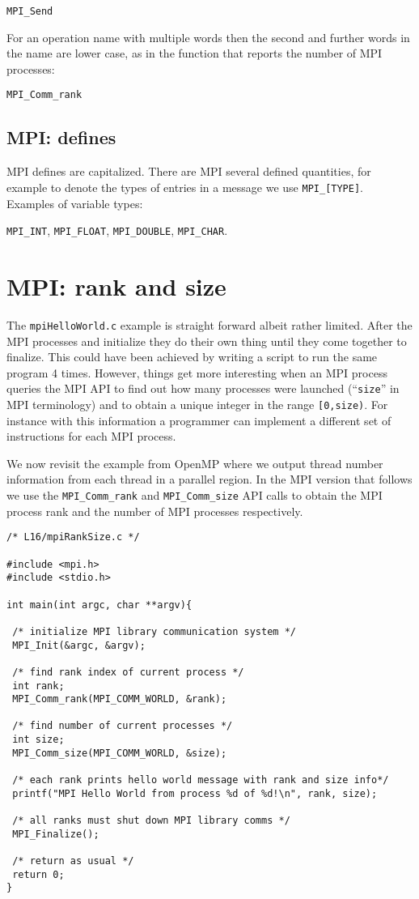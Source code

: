 \texttt{MPI\_Send}

For an operation name with multiple words then the second and further words in the name are lower case, as in the function that reports the number of MPI processes: 

\texttt{MPI\_Comm\_rank}

\subsection{MPI: defines}

MPI defines are capitalized. There are MPI several defined quantities, for example to denote the types of entries in a message we use \texttt{MPI\_[TYPE]}.  Examples of variable types:

\texttt{MPI\_INT}, \texttt{MPI\_FLOAT}, \texttt{MPI\_DOUBLE}, \texttt{MPI\_CHAR}.


\section{MPI: rank and size}

The \texttt{mpiHelloWorld.c} example is straight forward albeit rather limited. After the MPI processes and initialize they do their own thing until they come together to finalize. This could have been achieved by writing a script to run the same program 4 times. However, things get more interesting when an MPI process queries the MPI API to find out how many processes were launched (``\texttt{size}'' in MPI terminology) and to  obtain a unique integer in the range \texttt{[0,size)}. For instance with this information a programmer can implement a different set of instructions for each MPI process. 

We now revisit the example from OpenMP where we output thread number information from each thread in a parallel region. In the MPI version that follows we use the \texttt{MPI\_Comm\_rank} and \texttt{MPI\_Comm\_size} API calls to obtain the MPI process rank and the number of MPI processes respectively.

\begin{verbatim}
/* L16/mpiRankSize.c */

#include <mpi.h>
#include <stdio.h>

int main(int argc, char **argv){

 /* initialize MPI library communication system */
 MPI_Init(&argc, &argv);
 
 /* find rank index of current process */
 int rank;
 MPI_Comm_rank(MPI_COMM_WORLD, &rank);
 
 /* find number of current processes */
 int size;
 MPI_Comm_size(MPI_COMM_WORLD, &size);
 
 /* each rank prints hello world message with rank and size info*/
 printf("MPI Hello World from process %d of %d!\n", rank, size);
 
 /* all ranks must shut down MPI library comms */
 MPI_Finalize();
 
 /* return as usual */
 return 0;
}
\end{verbatim} 

